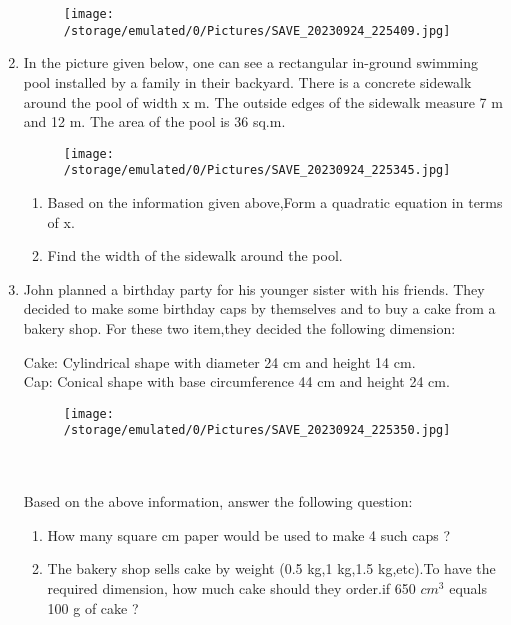 \documentclass[12pt]{article}
\begin{document}
\begin{enumerate}
            \begin{figure}[ht]
                \centering
                \texttt{[image: /storage/emulated/0/Pictures/SAVE\_20230924\_225409.jpg]}
                \caption{}
                \label{}
            \end{figure}
             \item In the picture given below, one can see a rectangular in-ground swimming pool installed by a family in their backyard. There is a concrete sidewalk around the pool of width x m. The outside edges of the sidewalk measure 7 m and 12 m. The area of the pool is 36 sq.m.
            \begin{figure}[ht]
                \centering
                \texttt{[image: /storage/emulated/0/Pictures/SAVE\_20230924\_225345.jpg]}
                \caption{}
                \label{}
            \end{figure}
            \begin{enumerate}
                \item Based on the information given above,Form a quadratic equation in terms of x.
                \item Find the width of the sidewalk around the pool.
            \end{enumerate}
           
            \item John planned a birthday party for his younger sister with his friends. They decided to make some birthday caps by themselves and to buy a cake from a bakery shop. For these two item,they decided the following dimension:
           
            Cake: Cylindrical shape with diameter 24 cm and height 14 cm.\\
            Cap: Conical shape with base circumference 44 cm and height 24 cm.\\
           \begin{figure}[ht]
                \centering
                \texttt{[image: /storage/emulated/0/Pictures/SAVE\_20230924\_225350.jpg]}
                \caption{}
                \label{}
            \end{figure}
            \\\\ Based on the above information, answer the following question:
       \begin{enumerate}
          \item How many square cm paper would be used to make 4 such caps ?
          \item  The bakery shop sells cake by weight (0.5 kg,1 kg,1.5 kg,etc).To have the required dimension, how much cake should they order.if 650 $cm^3$  equals 100 g of cake ?
            \end{enumerate}
             

\end{enumerate}
\end{document}
